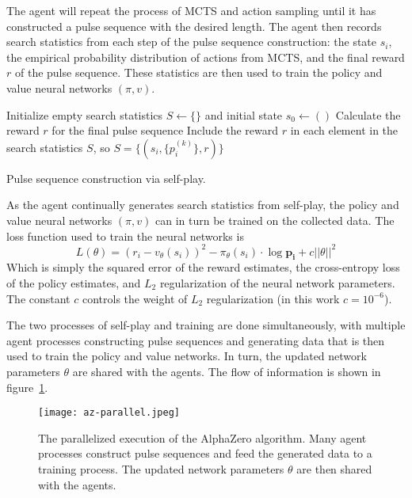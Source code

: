 The agent will repeat the process of MCTS and action sampling until it has constructed a pulse sequence with the desired length. The agent then records search statistics from each step of the pulse sequence construction: the state $s_i$, the empirical probability distribution of actions from MCTS, and the final reward $r$ of the pulse sequence. These statistics are then used to train the policy and value neural networks $(\pi, v)$.


\begin{algorithm}[H]
\BlankLine
Initialize empty search statistics $S \leftarrow \{\}$
and initial state $s_0 \leftarrow ()$
\;
Calculate the reward $r$ for the final pulse sequence \;
Include the reward $r$ in each element in the search statistics $S$, so $S = \{ (s_i, \{p_i^{(k)}\}, r) \}$ \;
\caption{Pulse sequence construction via self-play. \label{al:make_sequence}}
\end{algorithm}

As the agent continually generates search statistics from self-play, the policy and value neural networks $(\pi, v)$ can in turn be trained on the collected data. The loss function used to train the neural networks is
\begin{equation}\label{eq:az_loss}
    L(\theta) = (r_i - v_\theta(s_i))^2 - \pi_\theta(s_i) \cdot \log \mathbf{p_i} + c ||\theta||^2
\end{equation}
Which is simply the squared error of the reward estimates, the cross-entropy loss of the policy estimates, and $L_2$ regularization of the neural network parameters. The constant $c$ controls the weight of $L_2$ regularization (in this work $c = 10^{-6}$).

The two processes of self-play and training are done simultaneously, with multiple agent processes constructing pulse sequences and generating data that is then used to train the policy and value networks. In turn, the updated network parameters $\theta$ are shared with the agents. The flow of information is shown in figure~\ref{fig:az-parallel}.


\begin{figure}[H]
    \centering
    \texttt{[image: az-parallel.jpeg]}
    \caption{The parallelized execution of the AlphaZero algorithm. Many agent processes construct pulse sequences and feed the generated data to a training process. The updated network parameters $\theta$ are then shared with the agents.}
    \label{fig:az-parallel}
\end{figure}

